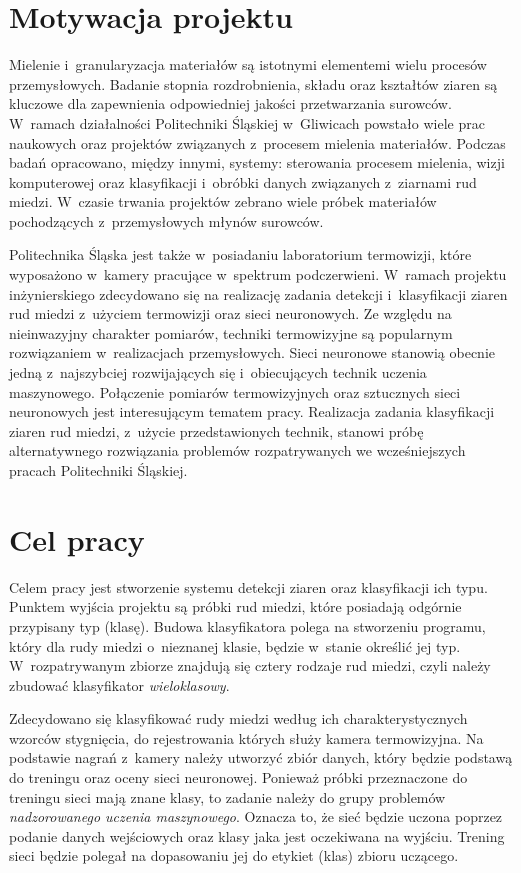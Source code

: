 \section{Motywacja projektu}
Mielenie i~granularyzacja materiałów są istotnymi elementemi wielu procesów
przemysłowych.
Badanie stopnia rozdrobnienia, składu oraz kształtów ziaren są kluczowe
dla zapewnienia odpowiedniej jakości przetwarzania surowców.
W~ramach działalności Politechniki Śląskiej w~Gliwicach powstało wiele prac
naukowych oraz projektów związanych z~procesem mielenia materiałów.
Podczas badań opracowano, między innymi, systemy: sterowania
procesem mielenia, wizji komputerowej oraz klasyfikacji i~obróbki
danych związanych z~ziarnami rud miedzi.
W~czasie trwania projektów zebrano wiele próbek materiałów pochodzących
z~przemysłowych młynów surowców.

Politechnika Śląska jest także w~posiadaniu laboratorium termowizji, które
wyposażono w~kamery pracujące w~spektrum podczerwieni.
W~ramach projektu inżynierskiego zdecydowano się na realizację zadania
detekcji i~klasyfikacji ziaren rud miedzi z~użyciem termowizji oraz sieci
neuronowych.
Ze względu na nieinwazyjny charakter pomiarów, techniki termowizyjne są
popularnym rozwiązaniem w~realizacjach przemysłowych.
Sieci neuronowe stanowią obecnie jedną z~najszybciej rozwijających się
i~obiecujących technik uczenia maszynowego.
Połączenie pomiarów termowizyjnych oraz sztucznych sieci neuronowych
jest interesującym tematem pracy.
Realizacja zadania klasyfikacji ziaren rud miedzi, z~użycie
przedstawionych technik, stanowi próbę alternatywnego rozwiązania problemów
rozpatrywanych we wcześniejszych pracach Politechniki Śląskiej.

\section{Cel pracy}
Celem pracy jest stworzenie systemu detekcji ziaren oraz klasyfikacji ich
typu.
Punktem wyjścia projektu są próbki rud miedzi, które posiadają odgórnie
przypisany typ (klasę).
Budowa klasyfikatora polega na stworzeniu programu, który
dla rudy miedzi o~nieznanej klasie, będzie w~stanie określić jej typ.
W~rozpatrywanym zbiorze znajdują się cztery rodzaje rud miedzi, czyli
należy zbudować klasyfikator \emph{wieloklasowy}.

Zdecydowano się klasyfikować rudy miedzi według ich charakterystycznych
wzorców stygnięcia, do rejestrowania których służy kamera termowizyjna.
Na podstawie nagrań z~kamery należy utworzyć zbiór danych, który będzie
podstawą do treningu oraz oceny sieci neuronowej.
Ponieważ próbki przeznaczone do treningu sieci mają znane klasy, 
to zadanie należy do grupy problemów \emph{nadzorowanego uczenia maszynowego}.
Oznacza to, że sieć będzie uczona poprzez podanie danych wejściowych
oraz klasy jaka jest oczekiwana na wyjściu.
Trening sieci będzie polegał na dopasowaniu jej do etykiet (klas) zbioru
uczącego.

